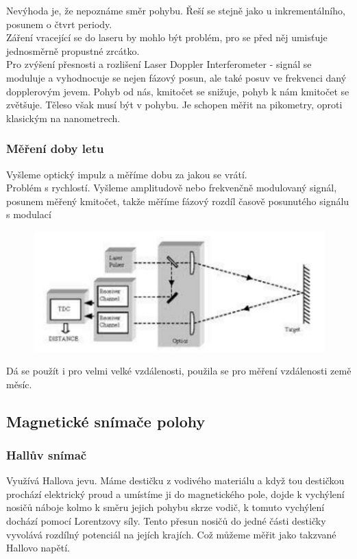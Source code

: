 Nevýhoda je, že nepoznáme směr pohybu. Řeší se stejně jako u inkrementálního, posunem o čtvrt periody.\\
Záření vracející se do laseru by mohlo být problém, pro se před něj umisťuje jednosměrně propustné zrcátko.\\
Pro zvýšení přesnosti a rozlišení Laser Doppler Interferometer - signál se moduluje a vyhodnocuje se nejen fázový posun, ale také posuv ve frekvenci daný dopplerovým jevem. Pohyb od nás, kmitočet se snižuje, pohyb k nám kmitočet se zvětšuje. Těleso však musí být v pohybu. Je schopen měřit na pikometry, oproti klasickým na nanometrech.\\

\subsubsection{Měření doby letu}
Vyšleme optický impulz a měříme dobu za jakou se vrátí. \\
Problém s rychlostí. Vyšleme amplitudově nebo frekvenčně modulovaný signál, posunem měřený kmitočet, takže měříme fázový rozdíl časově posunutého signálu s modulací

\begin{figure}
    \centering
    \includegraphics[scale = 0.1]{img/TOF.png}
\end{figure}

Dá se použít i pro velmi velké vzdálenosti, použila se pro měření vzdálenosti země měsíc.\\

\subsection{Magnetické snímače polohy}
\subsubsection{Hallův snímač}
Využívá Hallova jevu. Máme destičku z vodivého materiálu a když tou destičkou prochází elektrický proud a umístíme ji do magnetického pole, dojde k vychýlení nosičů náboje kolmo k směru jejich pohybu skrze vodič, k tomuto vychýlení dochází pomocí Lorentzovy síly. Tento přesun nosičů do jedné části destičky vyvolává rozdílný potenciál na jejích krajích. Což můžeme měřit jako takzvané Hallovo napětí. \\

